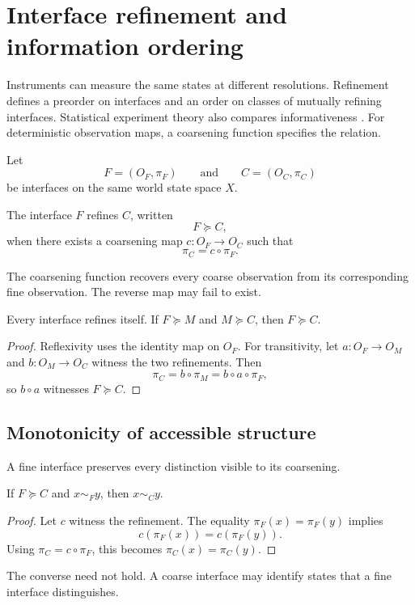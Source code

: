 \section{Interface refinement and information ordering}
\label{sec:refinement}

Instruments can measure the same states at different resolutions. Refinement defines a preorder on interfaces and an order on classes of mutually refining interfaces. Statistical experiment theory also compares informativeness \parencite{Blackwell1951,Blackwell1953,Torgersen1991}. For deterministic observation maps, a coarsening function specifies the relation.

Let
\[
F=(O_F,\pi_F)
\qquad\text{and}\qquad
C=(O_C,\pi_C)
\]
be interfaces on the same world state space \(X\).

\begin{definition}
The interface \(F\) refines \(C\), written
\[
F\succeq C,
\]
when there exists a coarsening map \(c:O_F\to O_C\) such that
\[
\pi_C=c\circ\pi_F.
\]
\end{definition}
The coarsening function recovers every coarse observation from its corresponding fine observation. The reverse map may fail to exist.

\begin{proposition}
Every interface refines itself. If \(F\succeq M\) and \(M\succeq C\), then \(F\succeq C\).
\end{proposition}

\begin{proof}
Reflexivity uses the identity map on \(O_F\). For transitivity, let \(a:O_F\to O_M\) and \(b:O_M\to O_C\) witness the two refinements. Then
\[
\pi_C=b\circ\pi_M=b\circ a\circ\pi_F,
\]
so \(b\circ a\) witnesses \(F\succeq C\).
\end{proof}
\subsection{Monotonicity of accessible structure}

A fine interface preserves every distinction visible to its coarsening.

\begin{theorem}
If \(F\succeq C\) and \(x\sim_F y\), then \(x\sim_C y\).
\end{theorem}

\begin{proof}
Let \(c\) witness the refinement. The equality \(\pi_F(x)=\pi_F(y)\) implies
\[
c(\pi_F(x))=c(\pi_F(y)).
\]
Using \(\pi_C=c\circ\pi_F\), this becomes \(\pi_C(x)=\pi_C(y)\).
\end{proof}
The converse need not hold. A coarse interface may identify states that a fine interface distinguishes.

